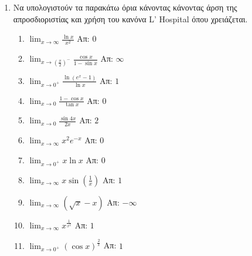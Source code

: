 \documentclass[a4paper,12pt]{article}
\begin{document}
\begin{enumerate}
\item Να υπολογιστούν τα παρακάτω όρια κάνοντας κάνοντας άρση της απροσδιοριστίας και χρήση του κανόνα \textlatin{L' Hospital} όπου χρειάζεται.

\begin{enumerate}
\item $\lim_{x\to \infty}\frac{\ln x}{x^2}$ \hfill Απ: $0$
\item $\lim_{x\to (\frac{\pi}{2})^-}\frac{\cos x}{1-\sin x}$ \hfill Απ: $\infty$
\item $\lim_{x\to 0^+}\frac{\ln(e^x-1)}{\ln x}$ \hfill Απ: $1$
\item $\lim_{x\to 0}\frac{1-\cos x }{\tan x}$ \hfill Απ: $0$
\item $\lim_{x\to 0}\frac{\sin 4x}{2x}$ \hfill Απ: $2$
\item $\lim_{x\to \infty}x^2e^{-x}$ \hfill Απ: $0$
\item $\lim_{x\to 0^+}x\ln x$ \hfill Απ: $0$
\item $\lim_{x\to \infty}x\sin(\frac{1}{x})$ \hfill Απ: $1$
\item $\lim_{x\to \infty}(\sqrt{x} - x)$ \hfill Απ: $-\infty$
\item $\lim_{x\to \infty}x^{\frac{1}{x^2}}$ \hfill Απ: $1$
\item $\lim_{x\to 0^+}(\cos x)^{\frac{2}{x}}$ \hfill Απ: $1$


\end{enumerate}

\end{enumerate}
\end{document}
